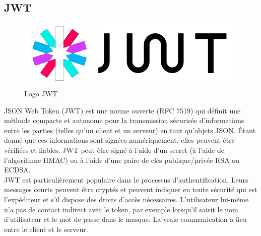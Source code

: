     \subsection{JWT}
    \begin{figure}[H]
        \centering
        \includegraphics[scale=0.4]{ACR/jwt-logo.png}
        \caption{Logo JWT}
    \end{figure}

    JSON Web Token\cite{jwt} (\acs{JWT}) est une norme ouverte (RFC 7519) qui définit une méthode compacte et autonome pour la transmission sécurisée d'informations entre les parties (telles qu'un client et un serveur) en tant qu'objets JSON. Étant donné que ces informations sont signées numériquement, elles peuvent être vérifiées et fiables. \acs{JWT} peut être signé à l'aide d'un secret (à l'aide de l'algorithme HMAC) ou à l'aide d'une paire de clés publique/privée RSA ou ECDSA.\\
    
    \acs{JWT} est particulièrement populaire dans le processus d'authentification. Leurs messages courts peuvent être cryptés et peuvent indiquer en toute sécurité qui est l'expéditeur et s'il dispose des droits d'accès nécessaires. L'utilisateur lui-même n'a pas de contact indirect avec le token, par exemple lorsqu'il saisit le nom d'utilisateur et le mot de passe dans le masque. La vraie communication a lieu entre le client et le serveur.\\

